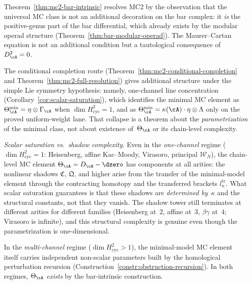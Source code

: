 \begin{remark}
\label{rem:mc2-bar-intrinsic-perspective}
Theorem~\ref{thm:mc2-bar-intrinsic} resolves MC2 by the
observation that the universal MC class is not an additional
decoration on the bar complex: it \emph{is} the positive-genus
part of the bar differential, which already exists by the modular
operad structure (Theorem~\ref{thm:bar-modular-operad}).  The
Maurer--Cartan equation is not an additional condition but a
tautological consequence of~$D_\cA^2 = 0$.

The conditional completion route
(Theorem~\ref{thm:mc2-conditional-completion} and
Theorem~\ref{thm:mc2-full-resolution}) gives additional
structure under the simple Lie symmetry hypothesis: namely,
one-channel line concentration
(Corollary~\ref{cor:scalar-saturation}),
which identifies the minimal MC element as
$\Theta^{\min}_\cA = \eta\otimes\Gamma_{\cA}$ when
$\dim H^2_{\mathrm{cyc}} = 1$, and as
$\Theta^{\min}_\cA = \kappa(\cA) \cdot \eta \otimes \Lambda$
only on the proved uniform-weight lane.  That collapse is a
theorem about the \emph{parametrization} of the minimal class,
not about existence of~$\Theta_{\cA}$ or its chain-level
complexity.

\emph{Scalar saturation vs.\ shadow complexity.}
Even in the \emph{one-channel} regime
($\dim H^2_{\mathrm{cyc}} = 1$: Heisenberg, affine
Kac--Moody, Virasoro, principal $\mathcal{W}_N$), the
chain-level MC element $\Theta_\cA = D_\cA - \dzero$ has
components at all arities: the nonlinear shadows
$\mathfrak{C}$, $\mathfrak{Q}$, and higher arise from
the transfer of the minimal-model element through the
contracting homotopy and the transferred brackets
$l_n^{\mathrm{tr}}$.  What scalar saturation guarantees
is that these shadows are \emph{determined by~$\kappa$}
and the structural constants, not that they vanish.
The shadow tower still terminates at different arities
for different families (Heisenberg at~$2$, affine at~$3$,
$\beta\gamma$ at~$4$; Virasoro is infinite), and this
structural complexity is genuine even though the
parametrization is one-dimensional.

In the \emph{multi-channel} regime
($\dim H^2_{\mathrm{cyc}} > 1$), the minimal-model MC element
itself carries independent non-scalar parameters built by
the homological perturbation recursion
(Construction~\ref{constr:obstruction-recursion}).
In both regimes, $\Theta_\cA$ \emph{exists} by the
bar-intrinsic construction.
\end{remark}

